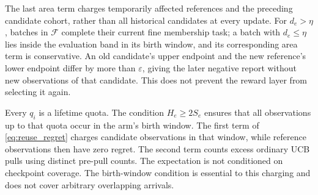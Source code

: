 \documentclass[11pt]{article}
\theoremstyle{remark}
\begin{document}
The last area term charges temporarily affected references and the preceding
candidate cohort, rather than all historical candidates at every update.
For $d_e>\eta$, batches in $\mathcal F$ complete their current fine
membership task; a batch with $d_e\le\eta$ lies inside the evaluation band
in its birth window, and its corresponding area term is conservative.
An old candidate's upper endpoint and the new reference's lower endpoint
differ by more than $\varepsilon$, giving the later negative report without
new observations of that candidate. This does not prevent the reward layer
from selecting it again.

Every $q_i$ is a lifetime quota. The condition $H_e\ge2S_e$ ensures that all
observations up to that quota occur in the arm's birth window. The first
term of \eqref{eq:reuse_regret} charges candidate observations in that
window, while reference observations then have zero regret. The second
term counts excess ordinary UCB pulls using distinct pre-pull counts. The
expectation is not conditioned on checkpoint coverage. The birth-window
condition is essential to this charging and does not cover arbitrary
overlapping arrivals.
\end{document}
